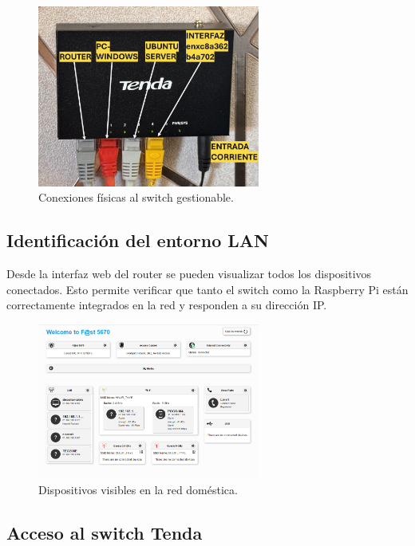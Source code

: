 \documentclass[11pt,a4paper,twoside]{report}
\begin{document}
\begin{figure}[H]
	\centering
	\includegraphics[width=0.65\textwidth]{pruebas_config/2-2.JPG}
	\caption{Conexiones físicas al switch gestionable.}
\end{figure}

\subsection*{Identificación del entorno LAN}

Desde la interfaz web del router se pueden visualizar todos los dispositivos conectados. Esto permite verificar que tanto el switch como la Raspberry Pi están correctamente integrados en la red y responden a su dirección IP.

\begin{figure}[H]
	\centering
	\includegraphics[width=0.65\textwidth]{pruebas_config/3-router.png}
	\caption{Dispositivos visibles en la red doméstica.}
\end{figure}

\subsection*{Acceso al switch Tenda}
\end{document}

